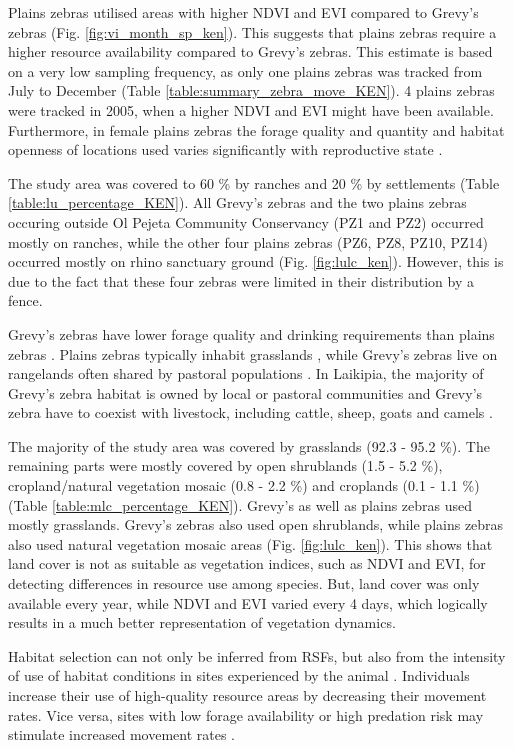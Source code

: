 \documentclass[12pt,a4paper, twoside, english]{article}
\begin{document}
Plains zebras utilised areas with higher NDVI and EVI compared to Grevy's zebras (Fig. \ref{fig:vi_month_sp_ken}). This suggests that plains zebras require a higher resource availability compared to Grevy's zebras. This estimate is based on a very low sampling frequency, as only one plains zebras was tracked from July to December (Table \ref{table:summary_zebra_move_KEN}). 4 plains zebras were tracked in 2005, when a higher NDVI and EVI might have been available. Furthermore, in female plains zebras the forage quality and quantity and habitat openness of locations used varies significantly with reproductive state \citep{Sundaresan2008}.

The study area was covered to 60 \% by ranches and 20 \% by settlements (Table \ref{table:lu_percentage_KEN}). All Grevy's zebras and the two plains zebras occuring outside Ol Pejeta Community Conservancy (PZ1 and PZ2) occurred mostly on ranches, while the other four plains zebras (PZ6, PZ8, PZ10, PZ14) occurred mostly on rhino sanctuary ground (Fig. \ref{fig:lulc_ken}). However, this is due to the fact that these four zebras were limited in their distribution by a fence. 

Grevy's zebras have lower forage quality and drinking requirements than plains zebras \citep{Sundaresan2008}. Plains zebras typically inhabit grasslands \citep{McNaughton1986}, while Grevy's zebras live on rangelands often shared by pastoral populations \citep{Sundaresan2008}. In Laikipia, the majority of Grevy's zebra habitat is owned by local or pastoral communities and Grevy's zebra have to coexist with livestock, including cattle, sheep, goats and camels \citep{Sundaresan2012}.

The majority of the study area was covered by grasslands (92.3 - 95.2 \%). The remaining parts were mostly covered by open shrublands (1.5 - 5.2 \%), cropland/natural vegetation mosaic (0.8 - 2.2 \%) and croplands (0.1 - 1.1 \%) (Table \ref{table:mlc_percentage_KEN}). Grevy's as well as plains zebras used mostly grasslands. Grevy's zebras also used open shrublands, while plains zebras also used natural vegetation mosaic areas (Fig. \ref{fig:lulc_ken}). This shows that land cover is not as suitable as vegetation indices, such as NDVI and EVI, for detecting differences in resource use among species. But, land cover was only available every year, while NDVI and EVI varied every 4 days, which logically results in a much better representation of vegetation dynamics.

Habitat selection can not only be inferred from RSFs, but also from the intensity of use of habitat conditions in sites experienced by the animal \citep{Freitas2008a}. Individuals increase their use of high-quality resource areas by decreasing their movement rates. Vice versa, sites with low forage availability or high predation risk may stimulate increased movement rates \citep{Fryxell2008, Avgar2013, VanMoorter2016}. 
\end{document}
